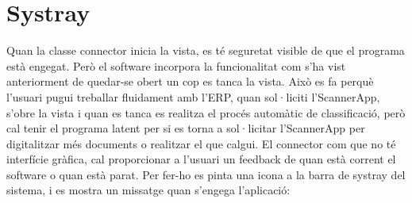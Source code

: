\documentclass[letterpaper,11pt,catalan]{sphinxmanual}
\begin{document}
\begin{sphinxVerbatim}[commandchars=\\\{\}]
               
                    
                 
                     
\end{sphinxVerbatim}


\section{Systray}
\label{\detokenize{index:systray}}
Quan la classe connector inicia la vista, es té seguretat visible de que el programa està engegat.
Però el software incorpora la funcionalitat com s'ha vist anteriorment de quedar-se obert un cop es
tanca la vista. Això es fa perquè l'usuari pugui treballar fluidament amb l'ERP, quan sol·liciti
l'ScannerApp, s'obre la vista i quan es tanca es realitza el procés automàtic de classificació,
però cal tenir el programa latent per si es torna a sol·licitar l'ScannerApp per digitalitzar
més documents o realitzar el que calgui. El connector com que no té interfície gràfica,
cal proporcionar a l'usuari un feedback de quan està corrent el software o quan està parat.
Per fer-ho es pinta una icona a la barra de systray del sistema, i es mostra un missatge quan
s'engega l'aplicació:
\end{document}
